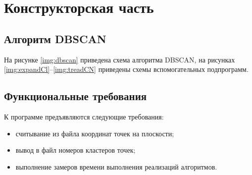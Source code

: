 \chapter{Конструкторская часть}

\section{Алгоритм DBSCAN}
На рисунке \ref{img:dbscan} приведена схема алгоритма DBSCAN, на рисунках \ref{img:expandCl}--\ref{img:treadCN} приведены схемы вспомогательных подпрограмм.

\clearpage

\clearpage




\clearpage
\section{Функциональные требования}
К программе предъявляются следующие требования:
\begin{itemize}
	\item считывание из файла координат точек на плоскости;
	\item вывод в файл номеров кластеров точек;
	\item выполнение замеров времени выполнения реализаций алгоритмов.
\end{itemize}